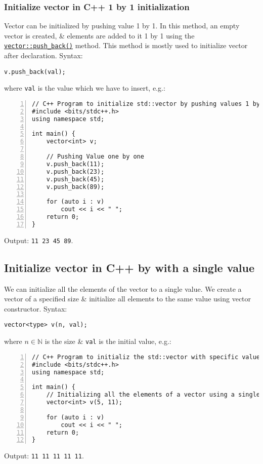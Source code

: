 \documentclass{article}
\begin{document}
\subsubsection{Initialize vector in C++ 1 by 1 initialization}
Vector can be initialized by pushing value 1 by 1. In this method, an empty vector is created, \& elements are added to it 1 by 1 using the \href{https://www.geeksforgeeks.org/vectorpush_back-vectorpop_back-c-stl/}{\tt vector::push\_back()} method. This method is mostly used to initialize vector after declaration. Syntax:
\begin{verbatim}
v.push_back(val);
\end{verbatim}
where {\tt val} is the value which we have to insert, e.g.:
\begin{Verbatim}[numbers=left,xleftmargin=5mm]
// C++ Program to initialize std::vector by pushing values 1 by 1
#include <bits/stdc++.h>
using namespace std;

int main() {
    vector<int> v;
	
    // Pushing Value one by one
    v.push_back(11);
    v.push_back(23);
    v.push_back(45);
    v.push_back(89);
	
    for (auto i : v)
        cout << i << " ";
    return 0;
}
\end{Verbatim}
Output: {\tt11 23 45 89}.


\subsection{Initialize vector in C++ by with a single value}
We can initialize all the elements of the vector to a single value. We create a vector of a specified size \& initialize all elements to the same value using vector constructor. Syntax:
\begin{verbatim}
vector<type> v(n, val);
\end{verbatim}
where $n\in\mathbb{N}$ is the size \& {\tt val} is the initial value, e.g.:
\begin{Verbatim}[numbers=left,xleftmargin=5mm]
// C++ Program to initializ the std::vector with specific value
#include <bits/stdc++.h>
using namespace std;

int main() {
    // Initializing all the elements of a vector using a single value
    vector<int> v(5, 11);
	
    for (auto i : v)
        cout << i << " ";
    return 0;
}
\end{Verbatim}
Output: {\tt11 11 11 11 11}.
\end{document}
